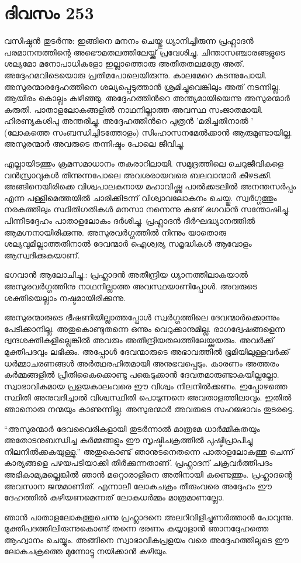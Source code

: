 \section{ദിവസം 253}


വസിഷ്ഠന്‍ തുടര്‍ന്നു: ഇങ്ങിനെ മനനം ചെയ്തു ധ്യാനിച്ചിരുന്ന പ്രഹ്ലാദന്‍ പരമാനന്ദത്തിന്റെ അഭൌമതലത്തിലേയ്ക്ക് പ്രവേശിച്ചു. ചിന്താസഞ്ചാരങ്ങളുടെ ശല്യമോ മനോപാധികളോ ഇല്ലാത്തൊരു അതീതതലമത്രേ അത്. അദ്ദേഹമവിടെയൊരു പ്രതിമപോലെയിരുന്നു. കാലമേറെ കടന്നുപോയി. അസുരന്മാരദ്ദേഹത്തിനെ ശല്യപ്പെടുത്താന്‍ ശ്രമിച്ചുവെങ്കിലും അത് നടന്നില്ല. ആയിരം കൊല്ലം കഴിഞ്ഞു. അദ്ദേഹത്തിന്‍റെ അന്ത്യമായിയെന്നു അസുരന്മാര്‍ കരുതി. പാതാളലോകങ്ങളില്‍ നാഥനില്ലാത്ത അവസ്ഥ സംജാതമായി. ഹിരണ്യകശിപു അന്തരിച്ചു. അദ്ദേഹത്തിന്‍റെ പുത്രന്‍ ’മരിച്ചതിനാല്‍ ’ (ലോകത്തെ സംബന്ധിച്ചിടത്തോളം) സിംഹാസനമേല്‍ക്കാന്‍ ആരുമുണ്ടായില്ല. അസുരന്മാര്‍ അവരുടെ തന്നിഷ്ടം പോലെ ജീവിച്ചു.

എല്ലായിടത്തും ക്രമസമാധാനം തകരാറിലായി. സമുദ്രത്തിലെ ചെറുജീവികളെ വന്‍സ്രാവുകള്‍ തിന്നുന്നപോലെ അവശരായവരെ ബലവാന്മാര്‍ കീഴടക്കി. അങ്ങിനെയിരിക്കെ വിശ്വപാലകനായ മഹാവിഷ്ണു പാല്‍ക്കടലില്‍ അനന്തസര്‍പ്പം എന്ന പള്ളിമെത്തയില്‍ ചാരിക്കിടന്ന് വിശ്വാവലോകനം ചെയ്തു. സ്വര്‍ഗ്ഗത്തും നരകത്തിലും സ്ഥിതിഗതികള്‍ മനസാ നന്നെന്നു കണ്ട് ഭഗവാന്‍ സന്തോഷിച്ചു. പിന്നീടദ്ദേഹം പാതാളലോകം ദര്‍ശിച്ചു. പ്രഹ്ലാദന്‍ ദീര്‍ഘദ്ധ്യാനത്തില്‍ ആമഗ്നനായിരിക്കുന്നു. അസുരവര്‍ഗ്ഗത്തില്‍ നിന്നും യാതൊരു ശല്യവുമില്ലാത്തതിനാല്‍ ദേവന്മാര്‍ ഐശ്വര്യ സമൃദ്ധികള്‍ ആവോളം ആസ്വദിക്കുകയാണ്.

ഭഗവാന്‍ ആലോചിച്ചു.: പ്രഹ്ലാദന്‍ അതീന്ദ്രിയ ധ്യാനത്തിലാകയാല്‍ അസുരവര്‍ഗ്ഗത്തിനു നാഥനില്ലാത്ത അവസ്ഥയാണിപ്പോള്‍.  അവരുടെ ശക്തിയെല്ലാം നഷ്ടമായിരിക്കുന്നു.  

അസുരന്മാരുടെ ഭീഷണിയില്ലാത്തപ്പോള്‍ സ്വര്‍ഗ്ഗത്തിലെ ദേവന്മാര്‍ക്കൊന്നും പേടിക്കാനില്ല. അതുകൊണ്ടുതന്നെ ഒന്നും വെറുക്കാനുമില്ല. രാഗദ്വേഷങ്ങളെന്ന ദ്വന്ദശക്തികളില്ലെങ്കില്‍ അവരും അതീന്ദ്രിയതലത്തിലേയ്ക്കുയരും. അവര്‍ക്ക് മുക്തിപദവും ലഭിക്കും. അപ്പോള്‍ ദേവന്മാരുടെ അഭാവത്തില്‍ ഭൂമിയിലുള്ളവര്‍ക്ക് ധര്‍മ്മാചരണങ്ങള്‍ അര്‍ത്ഥരഹിതമായി അനുഭവപ്പെടും. കാരണം അത്തരം കര്‍മ്മങ്ങളില്‍ പ്രീതികൈക്കൊണ്ടു പങ്കെടുക്കാന്‍ ദേവതമാരുണ്ടാകയില്ലല്ലോ. സ്വാഭാവികമായ പ്രളയകാലംവരെ ഈ വിശ്വം നിലനില്‍ക്കണം. ഇപ്പോഴത്തെ സ്ഥിതി അനുവദിച്ചാല്‍ വിശ്വസ്ഥിതി പൊടുന്നനെ അവതാളത്തിലാവും. ഇതില്‍ ഞാനൊരു നന്മയും കാണുന്നില്ല. അസുരന്മാര്‍ അവരുടെ സഹജഭാവം തുടരട്ടെ.

“അസുരന്മാര്‍ ദേവവൈരികളായി തുടര്‍ന്നാല്‍ മാത്രമേ ധാര്‍മ്മികതയും അതോടനുബന്ധിച്ച കര്‍മ്മങ്ങളും ഈ സൃഷ്ടിചക്രത്തില്‍ പുഷ്ടിപ്രാപിച്ചു നിലനില്‍ക്കകയുള്ളു.” അതുകൊണ്ട് ഞാനുടനെതന്നെ പാതാളലോകത്തു ചെന്ന് കാര്യങ്ങളെ പഴയപടിയാക്കി തീര്‍ക്കുന്നതാണ്. പ്രഹ്ലാദന് ചക്രവര്‍ത്തിപദം അഭികാമ്യമല്ലെങ്കില്‍ ഞാന്‍ മറ്റൊരാളിനെ അതിനായി കണ്ടെത്തും. പ്രഹ്ലാദന്റെ അവസാന ജന്മമാണിത്. എന്നാലീ ലോകചക്രം തീരുംവരെ അദ്ദേഹം ഈ ദേഹത്തില്‍ കഴിയണമെന്നത് ലോകധര്‍മ്മം മാത്രമാണല്ലോ.

ഞാന്‍ പാതാളലോകത്തുചെന്നു പ്രഹ്ലാദനെ അലറിവിളിച്ചുണര്‍ത്താന്‍ പോവുന്നു. മുക്തിപദത്തിലിരുന്നുകൊണ്ട് തന്നെ ഭരണം കയ്യാളാന്‍ ഞാനദ്ദേഹത്തെ ആഹ്വാനം ചെയ്യും. അങ്ങിനെ സ്വാഭാവികപ്രളയം വരെ അദ്ദേഹത്തിലൂടെ ഈ ലോകചക്രത്തെ മുന്നോട്ടു നയിക്കാന്‍ കഴിയും.

